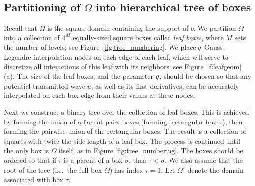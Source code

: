\documentclass[11pt,final]{amsart}
\theoremstyle{definition}
\numberwithin{remark}{section}
\numberwithin{definition}{section}
\numberwithin{pro}{section}
\begin{document}
\subsection{Partitioning of $\Omega$ into hierarchical tree of boxes}
\label{sec:part}


Recall that $\Omega$ is the square domain containing the support of $b$.
We partition $\Omega$ into a collection of $4^M$ equally-sized
square boxes called \textit{leaf boxes}, where $M$ sets the number of levels;
see Figure~\ref{fig:tree_numbering}.
We place $q$ Gauss--Legendre interpolation nodes on each edge of each leaf,
which will serve to discretize all interactions of this leaf with its neighbors;
see Figure~\ref{f:leafgeom}(a).
The size of the leaf boxes, and the parameter $q$,
should be chosen so that any potential transmitted wave $u$, as well as its first derivatives,
can be accurately interpolated on each box edge from their values at these nodes. %


Next we construct a binary tree over the collection of leaf boxes. This is achieved
by forming the union of adjacent pairs boxes (forming rectangular boxes), then
forming the pairwise union of the rectangular boxes.  The result is a collection
of squares with twice the side length of a leaf box.  The process is continued
until the only box is $\Omega$ itself, as in Figure
\ref{fig:tree_numbering}.  The boxes should be ordered so
that if $\tau$ is a parent of a box $\sigma$, then $\tau < \sigma$. We
also assume that the root of the tree (i.e.~the full box $\Omega$) has
index $\tau=1$. Let $\Omega^{\tau}$ denote the domain associated with box $\tau$.
\end{document}
